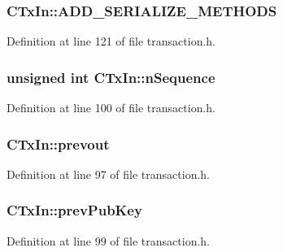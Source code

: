 \subsubsection[{A\+D\+D\+\_\+\+S\+E\+R\+I\+A\+L\+I\+Z\+E\+\_\+\+M\+E\+T\+H\+O\+D\+S}]{\setlength{\rightskip}{0pt plus 5cm}C\+Tx\+In\+::\+A\+D\+D\+\_\+\+S\+E\+R\+I\+A\+L\+I\+Z\+E\+\_\+\+M\+E\+T\+H\+O\+D\+S}\label{class_c_tx_in_aad2fd3fef5ad4ebe7e54c0db0cc34be4}


Definition at line 121 of file transaction.\+h.

\hypertarget{class_c_tx_in_aa0dd08a6ecd0a595d9ef4dad020c1ea5}{}
\subsubsection[{n\+Sequence}]{\setlength{\rightskip}{0pt plus 5cm}unsigned int C\+Tx\+In\+::n\+Sequence}\label{class_c_tx_in_aa0dd08a6ecd0a595d9ef4dad020c1ea5}


Definition at line 100 of file transaction.\+h.

\hypertarget{class_c_tx_in_aed9312051a25380cbd7f123408ab7c20}{}
\subsubsection[{prevout}]{ C\+Tx\+In\+::prevout}\label{class_c_tx_in_aed9312051a25380cbd7f123408ab7c20}


Definition at line 97 of file transaction.\+h.

\hypertarget{class_c_tx_in_a91732c5ffb13520a6989b162ff6683fc}{}
\subsubsection[{prev\+Pub\+Key}]{ C\+Tx\+In\+::prev\+Pub\+Key}\label{class_c_tx_in_a91732c5ffb13520a6989b162ff6683fc}


Definition at line 99 of file transaction.\+h.

\hypertarget{class_c_tx_in_aba540fd902366210a6ad6cd9a18fe763}{}
